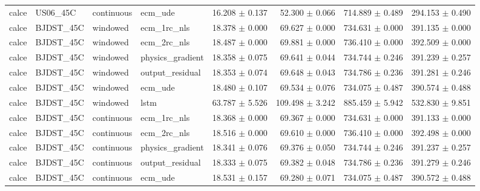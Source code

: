 \begin{longtable}{llllrrrr}
calce & US06\_45C & continuous & ecm\_ude & 16.208 $\pm$ 0.137 & 52.300 $\pm$ 0.066 & 714.889 $\pm$ 0.489 & 294.153 $\pm$ 0.490 \\
calce & BJDST\_45C & windowed & ecm\_1rc\_nls & 18.378 $\pm$ 0.000 & 69.627 $\pm$ 0.000 & 734.631 $\pm$ 0.000 & 391.135 $\pm$ 0.000 \\
calce & BJDST\_45C & windowed & ecm\_2rc\_nls & 18.487 $\pm$ 0.000 & 69.881 $\pm$ 0.000 & 736.410 $\pm$ 0.000 & 392.509 $\pm$ 0.000 \\
calce & BJDST\_45C & windowed & physics\_gradient & 18.358 $\pm$ 0.075 & 69.641 $\pm$ 0.044 & 734.744 $\pm$ 0.246 & 391.239 $\pm$ 0.257 \\
calce & BJDST\_45C & windowed & output\_residual & 18.353 $\pm$ 0.074 & 69.648 $\pm$ 0.043 & 734.786 $\pm$ 0.236 & 391.281 $\pm$ 0.246 \\
calce & BJDST\_45C & windowed & ecm\_ude & 18.480 $\pm$ 0.107 & 69.534 $\pm$ 0.076 & 734.075 $\pm$ 0.487 & 390.574 $\pm$ 0.488 \\
calce & BJDST\_45C & windowed & lstm & 63.787 $\pm$ 5.526 & 109.498 $\pm$ 3.242 & 885.459 $\pm$ 5.942 & 532.830 $\pm$ 9.851 \\
calce & BJDST\_45C & continuous & ecm\_1rc\_nls & 18.368 $\pm$ 0.000 & 69.367 $\pm$ 0.000 & 734.631 $\pm$ 0.000 & 391.133 $\pm$ 0.000 \\
calce & BJDST\_45C & continuous & ecm\_2rc\_nls & 18.516 $\pm$ 0.000 & 69.610 $\pm$ 0.000 & 736.410 $\pm$ 0.000 & 392.498 $\pm$ 0.000 \\
calce & BJDST\_45C & continuous & physics\_gradient & 18.341 $\pm$ 0.076 & 69.376 $\pm$ 0.050 & 734.744 $\pm$ 0.246 & 391.237 $\pm$ 0.257 \\
calce & BJDST\_45C & continuous & output\_residual & 18.333 $\pm$ 0.075 & 69.382 $\pm$ 0.048 & 734.786 $\pm$ 0.236 & 391.279 $\pm$ 0.246 \\
calce & BJDST\_45C & continuous & ecm\_ude & 18.531 $\pm$ 0.157 & 69.280 $\pm$ 0.071 & 734.075 $\pm$ 0.487 & 390.572 $\pm$ 0.488 \\
\end{longtable}
